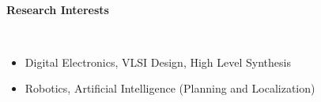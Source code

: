 \documentclass[a4paper,11pt]{article}
\newcommand{\isep}{-2 pt}
\newcommand{\lsep}{-0.5cm}
\newcommand{\resheading}[1]{{\small \colorbox{mygrey}{\begin{minipage}{0.975\textwidth}{\textbf{#1 \vphantom{p\^{E}}}}\end{minipage}}}}
\begin{document}
\hspace{0.5cm}\\
\hspace{0.5cm}\\
\hspace{0.5cm}\\
\hspace{0.5cm}\\
\hspace{0.5cm}\\
\hspace{0.5cm}\\ 
\hspace{0.5cm}\\
\hspace{0.5cm}\\
\hspace{0.5cm}\\
\hspace{0.5cm}\\
\hspace{0.5cm}\\[-0.2cm]

\begin{comment}
\begin{tabular}{m{8cm} m{8cm}} 
    \large{KRISHNA SAVANT SYREDDY}  & 100070056\\
    \large{Electrical Engineering}  & UG Third Year (B.Tech)\\
    \large{Indian Institute of Technology, Bombay} & DOB: 19-06-1993 \\
    \large{\url{sk.savant@iitb.ac.in}} & +919757033532
\end{tabular}

\resheading{\textbf{\large{Education}}}
\begin{itemize}
    \item Undergraduate Degree - IIT Bombay - 2008 to present  - 8.59
    \item Intermediate/+2 - BIE, AP - SR Junior College - 2010 - 90.50
    \item Matriculation - CBSE - Warangal Public School - 2008 - 93.00
\end{itemize}
\end{comment}


\resheading{\textbf{\large Research Interests}} \\[\lsep] 
\begin{itemize} \itemsep \isep
    \item Digital Electronics, VLSI Design, High Level Synthesis
    \item Robotics, Artificial Intelligence (Planning  and Localization)
\end{itemize}
\end{document}
